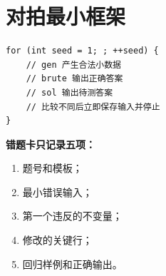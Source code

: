 \section{对拍最小框架}

\begin{lstlisting}[style=cpp]
for (int seed = 1; ; ++seed) {
    // gen 产生合法小数据
    // brute 输出正确答案
    // sol 输出待测答案
    // 比较不同后立即保存输入并停止
}
\end{lstlisting}

\begin{card}
\textbf{错题卡只记录五项：}
\begin{enumerate}
\item 题号和模板；
\item 最小错误输入；
\item 第一个违反的不变量；
\item 修改的关键行；
\item 回归样例和正确输出。
\end{enumerate}
\end{card}
